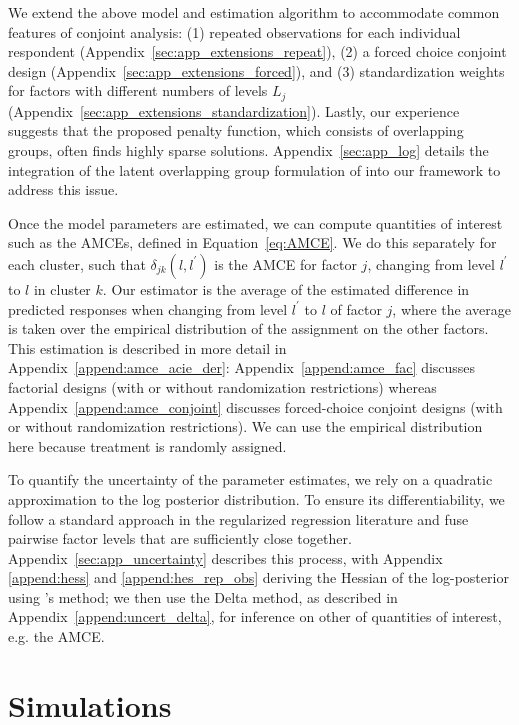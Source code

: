 \documentclass[11pt]{article}
\begin{document}
We extend the above model and estimation algorithm to accommodate
common features of conjoint analysis: (1) repeated observations for
each individual respondent (Appendix~\ref{sec:app_extensions_repeat}),
(2) a forced choice conjoint design
(Appendix~\ref{sec:app_extensions_forced}), and (3) standardization
weights for factors with different numbers of levels $L_j$
(Appendix~\ref{sec:app_extensions_standardization}). Lastly, our
experience suggests that the proposed penalty function, which consists
of overlapping groups, often finds highly sparse
solutions. Appendix~\ref{sec:app_log} details the integration of the
latent overlapping group formulation of \cite{yan2017hierarchical}
into our framework to address this issue.

Once the model parameters are estimated, we can compute quantities of
interest such as the AMCEs, defined in Equation~\eqref{eq:AMCE}.  We
do this separately for each cluster, such that
$\delta_{jk} (l, l^\prime)$ is the AMCE for factor $j$, changing from
level $l^{\prime}$ to $l$ in cluster $k$.  Our estimator is the
average of the estimated difference in predicted responses when
changing from level $l^{\prime}$ to $l$ of factor $j$, where the
average is taken over the empirical distribution of the assignment on
the other factors.  This estimation is described in more detail in
Appendix~\ref{append:amce_acie_der}: Appendix~\ref{append:amce_fac}
discusses factorial designs (with or without randomization
restrictions) whereas Appendix~\ref{append:amce_conjoint} discusses
forced-choice conjoint designs (with or without randomization
restrictions).  We can use the empirical distribution here because
treatment is randomly assigned.

To quantify the uncertainty of the parameter estimates, we rely on a
quadratic approximation to the log posterior distribution. To ensure
its differentiability, we follow a standard approach in the
regularized regression literature \citep[e.g.,][]{fan2001variable} and 
fuse pairwise factor levels that are sufficiently close
together. Appendix~\ref{sec:app_uncertainty} describes this process,
with Appendix \ref{append:hess} and \ref{append:hes_rep_obs} deriving
the Hessian of the log-posterior using \cite{loui:82}'s method; we
then use the Delta method, as described in
Appendix~\ref{append:uncert_delta}, for inference on other of
quantities of interest, e.g. the AMCE.


\section{Simulations}\label{sec:simulation}
\end{document}
